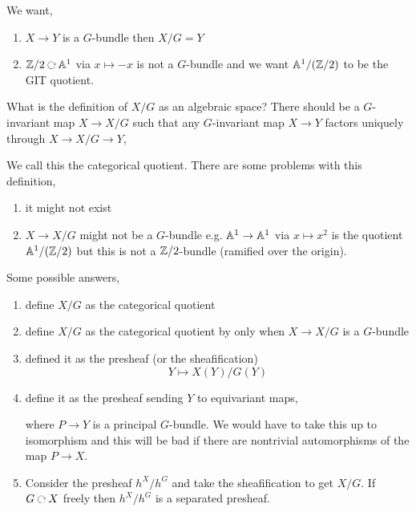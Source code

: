 \documentclass[12pt]{article}
\begin{document}
\begin{example}
We want,
\begin{enumerate}
\item $X \to Y$ is a $G$-bundle then $X/G = Y$
\item $\Z / 2 \acts \A^1$ via $x \mapsto -x$ is not a $G$-bundle and we want $\mathbb{A}^1 / (\mathbb{Z} / 2)$ to be the GIT quotient. 
\end{enumerate}
\end{example}
\noindent
What is the definition of $X/G$ as an algebraic space? There should be a $G$-invariant map $X \to X/G$ such that any $G$-invariant map $X \to Y$ factors uniquely through $X \to X / G \to Y$,
\begin{center}
\end{center} 
We call this the categorical quotient. There are some problems with this definition,
\begin{enumerate}
\item it might not exist
\item $X \to X / G$ might not be a $G$-bundle e.g. $\mathbb{A}^1 \to \mathbb{A}^1$ via $x \mapsto x^2$ is the quotient $\mathbb{A}^1 / (\mathbb{Z} / 2)$ but this is not a $\mathbb{Z}/2$-bundle (ramified over the origin). 
\end{enumerate}

Some possible answers,
\begin{enumerate}
\item define $X/G$ as the categorical quotient
\item define $X/G$ as the categorical quotient by only when $X \to X / G$ is a $G$-bundle
\item defined it as the presheaf (or the sheafification)
\[ Y \mapsto X(Y) / G(Y) \]
\item define it as the presheaf sending $Y$ to equivariant maps,
\begin{center}
\end{center}
where $P \to Y$ is a principal $G$-bundle. We would have to take this up to isomorphism and this will be bad if there are nontrivial automorphisms of the map $P \to X$.
\item Consider the presheaf $h^X / h^G$ and take the sheafification to get $X/G$. If $G \acts X$ freely then $h^X / h^G$ is a separated presheaf.
\end{enumerate}
\end{document}
